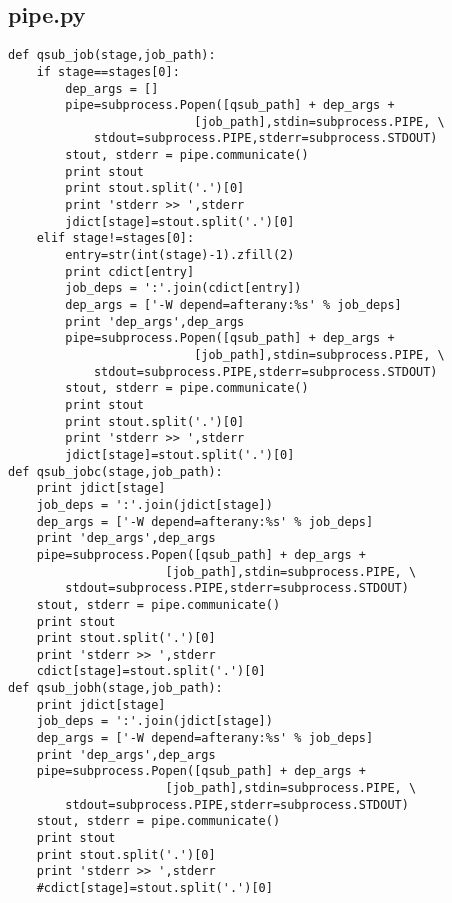 \documentclass[11pt]{article}
\begin{document}
\subsection{pipe.py}
\begin{verbatim}
def qsub_job(stage,job_path):
    if stage==stages[0]:
        dep_args = []
        pipe=subprocess.Popen([qsub_path] + dep_args +
                          [job_path],stdin=subprocess.PIPE, \
            stdout=subprocess.PIPE,stderr=subprocess.STDOUT)
        stout, stderr = pipe.communicate()
        print stout
        print stout.split('.')[0]
        print 'stderr >> ',stderr
        jdict[stage]=stout.split('.')[0]
    elif stage!=stages[0]:
        entry=str(int(stage)-1).zfill(2)
        print cdict[entry]
        job_deps = ':'.join(cdict[entry])
        dep_args = ['-W depend=afterany:%s' % job_deps]
        print 'dep_args',dep_args
        pipe=subprocess.Popen([qsub_path] + dep_args +
                          [job_path],stdin=subprocess.PIPE, \
            stdout=subprocess.PIPE,stderr=subprocess.STDOUT)
        stout, stderr = pipe.communicate()
        print stout
        print stout.split('.')[0]
        print 'stderr >> ',stderr
        jdict[stage]=stout.split('.')[0]
def qsub_jobc(stage,job_path):
    print jdict[stage]
    job_deps = ':'.join(jdict[stage])
    dep_args = ['-W depend=afterany:%s' % job_deps]
    print 'dep_args',dep_args
    pipe=subprocess.Popen([qsub_path] + dep_args +
                      [job_path],stdin=subprocess.PIPE, \
        stdout=subprocess.PIPE,stderr=subprocess.STDOUT)
    stout, stderr = pipe.communicate()
    print stout
    print stout.split('.')[0]
    print 'stderr >> ',stderr
    cdict[stage]=stout.split('.')[0]
def qsub_jobh(stage,job_path):
    print jdict[stage]
    job_deps = ':'.join(jdict[stage])
    dep_args = ['-W depend=afterany:%s' % job_deps]
    print 'dep_args',dep_args
    pipe=subprocess.Popen([qsub_path] + dep_args +
                      [job_path],stdin=subprocess.PIPE, \
        stdout=subprocess.PIPE,stderr=subprocess.STDOUT)
    stout, stderr = pipe.communicate()
    print stout
    print stout.split('.')[0]
    print 'stderr >> ',stderr
    #cdict[stage]=stout.split('.')[0]


\end{verbatim}
\end{document}
